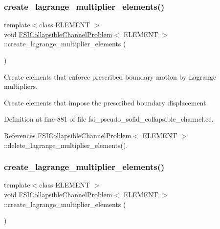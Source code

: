 \subsubsection{\texorpdfstring{create\+\_\+lagrange\+\_\+multiplier\+\_\+elements()}{create\_lagrange\_multiplier\_elements()}\hspace{0.1cm}{\footnotesize\ttfamily [1/2]}}
{\footnotesize\ttfamily template$<$class E\+L\+E\+M\+E\+NT $>$ \\
void \hyperlink{classFSICollapsibleChannelProblem}{F\+S\+I\+Collapsible\+Channel\+Problem}$<$ E\+L\+E\+M\+E\+NT $>$\+::create\+\_\+lagrange\+\_\+multiplier\+\_\+elements (\begin{DoxyParamCaption}{ }\end{DoxyParamCaption})\hspace{0.3cm}{\ttfamily [private]}}



Create elements that enforce prescribed boundary motion by Lagrange multipliers. 

Create elements that impose the prescribed boundary displacement. 

Definition at line 881 of file fsi\+\_\+pseudo\+\_\+solid\+\_\+collapsible\+\_\+channel.\+cc.



References F\+S\+I\+Collapsible\+Channel\+Problem$<$ E\+L\+E\+M\+E\+N\+T $>$\+::delete\+\_\+lagrange\+\_\+multiplier\+\_\+elements().

\mbox{\label{classFSICollapsibleChannelProblem_a328465bc567702963e06c07f5550f80a}} 
\subsubsection{\texorpdfstring{create\+\_\+lagrange\+\_\+multiplier\+\_\+elements()}{create\_lagrange\_multiplier\_elements()}\hspace{0.1cm}{\footnotesize\ttfamily [2/2]}}
{\footnotesize\ttfamily template$<$class E\+L\+E\+M\+E\+NT $>$ \\
void \hyperlink{classFSICollapsibleChannelProblem}{F\+S\+I\+Collapsible\+Channel\+Problem}$<$ E\+L\+E\+M\+E\+NT $>$\+::create\+\_\+lagrange\+\_\+multiplier\+\_\+elements (\begin{DoxyParamCaption}{ }\end{DoxyParamCaption})\hspace{0.3cm}{\ttfamily [private]}}



